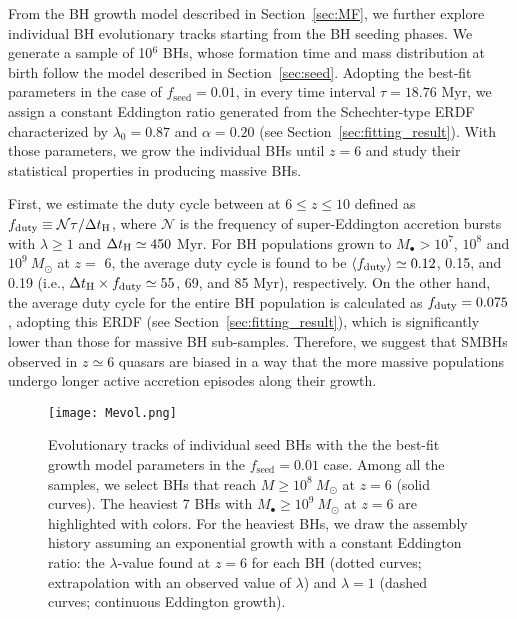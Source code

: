 \documentclass[twocolumn, twocolappendix]{aastex63}
\newcommand{\Msun}{M_\odot}
\newcommand{\tlife}{\tau}
\newcommand{\fseed}{f_\mathrm{seed}}
\begin{document}
\begin{CJK*}{UTF8}{gbsn}
From the BH growth model described in Section~\ref{sec:MF}, we further explore individual BH evolutionary tracks starting from the BH seeding phases.
We generate a sample of 10$^6$ BHs, whose formation time and mass distribution at birth follow the model described in Section~\ref{sec:seed}. 
Adopting the best-fit parameters in the case of $\fseed = 0.01$, in every time interval $\tlife=18.76$ Myr,
we assign a constant Eddington ratio generated from the Schechter-type ERDF characterized by $\lambda_0=0.87$ and $\alpha=0.20$ 
(see Section~\ref{sec:fitting_result}).
With those parameters, we grow the individual BHs until $z=6$ and study their statistical properties in producing massive BHs.


First, we estimate the duty cycle between at $6\leq z\leq 10$ defined as $f_{\rm duty} \equiv \mathcal{N}\tlife/\Delta t_{\rm H}$, 
where $\mathcal{N}$ is the frequency of super-Eddington accretion bursts with $\lambda \geq 1$ and $\Delta t_{\rm H}\simeq 450$ Myr.
For BH populations grown to $M_\bullet>10^7$, $10^8$ and $10^9~\Msun$ at $z=$ 6,
the average duty cycle is found to be $\langle f_{\rm duty}\rangle \simeq 0.12$, 0.15, and 0.19
(i.e., $\Delta t_{\rm H} \times f_{\rm duty} \simeq 55$, 69, and 85 Myr), respectively.
On the other hand, the average duty cycle for the entire BH population is calculated as $f_{\rm duty}= 0.075$,
adopting this ERDF (see Section~\ref{sec:fitting_result}), which is significantly lower than those for massive BH sub-samples.
Therefore, we suggest that SMBHs observed in $z\simeq 6$ quasars are biased in a way that
the more massive populations undergo longer active accretion episodes along their growth.


\begin{figure*}
\centering
\texttt{[image: Mevol.png]}
\caption{
Evolutionary tracks of individual seed BHs with the the best-fit growth model parameters in the $\fseed=0.01$ case.
Among all the samples, we select BHs that reach $M\geq 10^8~\Msun$ at $z=6$ (solid curves). 
The heaviest 7 BHs with $M_\bullet \geq 10^9~\Msun$ at $z=6$ are highlighted with colors. 
For the heaviest BHs, we draw the assembly history assuming an exponential growth with a constant Eddington ratio: 
the $\lambda$-value found at $z=6$ for each BH (dotted curves; extrapolation with an observed value of $\lambda$) and 
$\lambda =1$ (dashed curves; continuous Eddington growth).
}
\label{fig:Mevol}
\end{figure*}
%
%



\end{CJK*}
\end{document}
